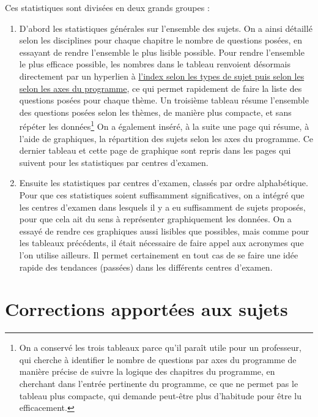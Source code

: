 Ces statistiques sont divisées en deux grands groupes :

\begin{enumerate}
\item D'abord les statistiques générales sur l'ensemble des sujets. On a ainsi détaillé selon les disciplines pour chaque chapitre le nombre de questions posées, en essayant de rendre l'ensemble le plus lisible possible. Pour rendre l'ensemble le plus efficace possible, les nombres dans le tableau renvoient désormais directement par un hyperlien à \hyperlink{indexv}{l'index selon les types de sujet puis selon les selon les axes du programme}, ce qui permet rapidement de faire la liste des questions posées pour chaque thème. Un troisième tableau résume l'ensemble des questions posées selon les thèmes, de manière plus compacte, et sans répéter les données\footnote{On a conservé les trois tableaux parce qu'il paraît utile pour un professeur, qui cherche à identifier le nombre de questions par axes du programme de manière précise de suivre la logique des chapitres du programme, en cherchant dans l'entrée pertinente du programme, ce que ne permet pas le tableau plus compacte, qui demande peut-être plus d'habitude pour être lu efficacement.} On a également inséré, à la suite une page qui résume, à l'aide de graphiques, la répartition des sujets selon les axes du programme. Ce dernier tableau et cette page de graphique sont repris dans les pages qui suivent pour les statistiques par centres d'examen.

\item Ensuite les statistiques par centres d'examen, classés par ordre alphabétique. Pour que ces statistiques soient suffisamment significatives, on a intégré que les centres d'examen dans lesquels il y a eu suffisamment de sujets proposés, pour que cela ait du sens à représenter graphiquement les données. On a essayé de rendre ces graphiques aussi lisibles que possibles, mais comme pour les tableaux précédents, il était nécessaire de faire appel aux acronymes que l'on utilise ailleurs. Il permet certainement en tout cas de se faire une idée rapide des tendances (passées) dans les différents centres d'examen.
\end{enumerate}

\section*{Corrections apportées aux sujets}

